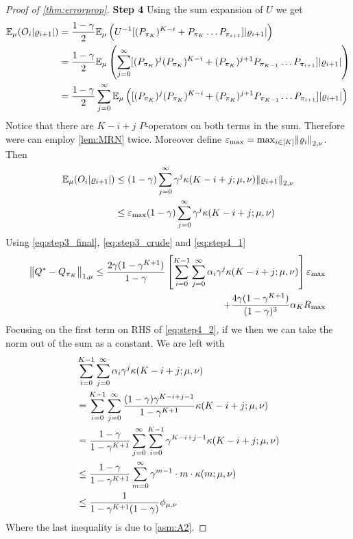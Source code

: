 \begin{proof}[Proof of \cref{thm:errorprop}]
  \textbf{Step 4}
  Using the sum expansion of $U$ we get
  \begin{align}
    \mathbb{E}_\mu (O_i \abs{\varrho_{i+1}})
    &= \frac{1 - \gamma}{2} \mathbb{E}_\mu \left( U^{-1} [(P_{\pi_K})^{K-i} +
    P_{\pi_K} \dots P_{\pi_{i+1}}] \abs{\varrho_{i+1}} \right)
    \\ &= \frac{1 - \gamma}{2} \mathbb{E}_\mu \left( \sum_{j=0}^\infty
      [(P_{\pi_K})^j (P_{\pi_K})^{K-i}
      + (P_{\pi_K})^{j+1} P_{\pi_{K-1}} \dots P_{\pi_{i+1}}]
    \abs{\varrho_{i+1}} \right)
    \\ &= \frac{1 - \gamma}{2} \sum_{j=0}^\infty
      \mathbb{E}_\mu \left( [(P_{\pi_K})^j (P_{\pi_K})^{K-i}
      + (P_{\pi_K})^{j+1} P_{\pi_{K-1}} \dots P_{\pi_{i+1}}] 
      \abs{\varrho_{i+1}} \right)
  \end{align}
  Notice that there are $K-i+j$ $P$-operators on both terms
  in the sum. Therefore were can employ \cref{lem:MRN} twice.
  Moreover define
  $\varepsilon_{\max} = \max_{i \in [K]} \norm{\varrho_i}_{2,\nu}$.
  Then
  \begin{align}
    \mathbb{E}_\mu(O_i \abs{\varrho_{i+1}}) &\leq (1-\gamma)
    \sum_{j=0}^\infty \gamma^j \kappa(K-i+j;\mu,\nu) \norm{\varrho_{i+1}}_{2,\nu}
    \notag
    \\ &\leq \varepsilon_{\max} (1-\gamma)
    \sum_{j=0}^\infty \gamma^j \kappa(K-i+j;\mu,\nu) 
    \label{eq:step4_1}
  \end{align} 
  Using \cref{eq:step3_final}, \cref{eq:step3_crude} and \cref{eq:step4_1}
  \begin{equation}
    \begin{split}
    \norm{Q^* - Q_{\pi_K}}_{1,\mu} \leq
    \frac{2 \gamma (1- \gamma^{K+1})}{1-\gamma} 
    \left[ \sum_{i=0}^{K-1} \sum_{j=0}^\infty
    \alpha_i \gamma^j \kappa(K-i+j; \mu, \nu) \right] \varepsilon_{\max}
    \\ + \frac{4 \gamma (1-\gamma^{K+1})}{(1-\gamma)^3} \alpha_K R_{\max}
  \end{split}
  \label{eq:step4_2}
  \end{equation} 
  Focusing on the first term on RHS of \cref{eq:step4_2}, if we 
  then we can take the norm out of the sum as a constant. We are left with
  \begin{align}
    & \sum_{i=0}^{K-1} \sum_{j=0}^\infty \alpha_i \gamma^j \kappa(K-i+j;\mu,\nu)
    \notag
    \\ &= \sum_{i=0}^{K-1} \sum_{j=0}^\infty  
    \frac{(1-\gamma) \gamma^{K-i+j-1}}{1-\gamma^{K+1}} \kappa(K-i+j;\mu,\nu)
    \notag
    \\ &= \frac{1-\gamma}{1-\gamma^{K+1}} \sum_{j=0}^\infty \sum_{i=0}^{K-1} 
    \gamma^{K-i+j-1} \kappa(K-i+j;\mu,\nu) \notag
    \\ &\leq \frac{1-\gamma}{1-\gamma^{K+1}} \sum_{m=0}^\infty
    \gamma^{m-1} \cdot m \cdot \kappa(m; \mu, \nu) \notag
    \\ &\leq \frac{1}{1-\gamma^{K+1}(1-\gamma)} \phi_{\mu,\nu}
    \label{eq:step4_3}
  \end{align}
  Where the last inequality is due to \cref{asm:A2}.
  

\end{proof}
